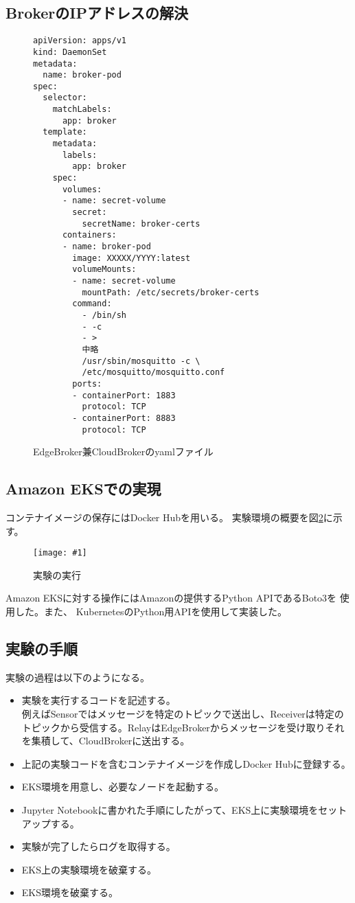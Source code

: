 \documentclass[submit,techrep]{ipsj}
\newcommand{\reffig}[1]{図\ref{#1}}
\newcommand{\epsfig}[4]{
\begin{figure}[tb]
  \begin{center}
    \texttt{[image: \#1]}
  \end{center}
  \caption{#3}
  \label{#4}
\end{figure}}
\newcommand{\kbs}{Kubernetes}
\begin{document}
\subsection{BrokerのIPアドレスの解決}



\begin{figure}[tbp]
  \renewcommand{\baselinestretch}{0.8}
  \begin{lstlisting}
apiVersion: apps/v1
kind: DaemonSet
metadata:
  name: broker-pod
spec:
  selector:
    matchLabels:
      app: broker
  template:
    metadata:
      labels:
        app: broker
    spec:
      volumes:
      - name: secret-volume
        secret:
          secretName: broker-certs
      containers:
      - name: broker-pod
        image: XXXXX/YYYY:latest
        volumeMounts:
        - name: secret-volume
          mountPath: /etc/secrets/broker-certs
        command:
          - /bin/sh
          - -c
          - >
          中略
          /usr/sbin/mosquitto -c \
          /etc/mosquitto/mosquitto.conf
        ports:
        - containerPort: 1883
          protocol: TCP
        - containerPort: 8883
          protocol: TCP
  \end{lstlisting}
  \caption{EdgeBroker兼CloudBrokerのyamlファイル}
  \label{broker-yaml}
\end{figure}



\subsection{Amazon EKSでの実現}

コンテナイメージの保存にはDocker Hub\cite{dockerhub}を用いる。
実験環境の概要を\reffig{experiment}に示す。

\epsfig{figs/experiment.pdf}{width=8.5cm}{実験の実行}{experiment}


Amazon EKSに対する操作にはAmazonの提供するPython APIであるBoto3\cite{boto3}を
使用した。また、
\kbs のPython用API\cite{kubernetes-python-client}を使用して実装した。


\subsection{実験の手順}
実験の過程は以下のようになる。
\begin{itemize}
  \item 実験を実行するコードを記述する。\\例えばSensorではメッセージを特定のトピックで送出し、Receiverは特定のトピックから受信する。RelayはEdgeBrokerからメッセージを受け取りそれを集積して、CloudBrokerに送出する。
  \item 上記の実験コードを含むコンテナイメージを作成しDocker Hubに登録する。
  \item EKS環境を用意し、必要なノードを起動する。
  \item Jupyter Notebookに書かれた手順にしたがって、EKS上に実験環境をセットアップする。
  \item 実験が完了したらログを取得する。
  \item EKS上の実験環境を破棄する。
  \item EKS環境を破棄する。
\end{itemize}
\end{document}
